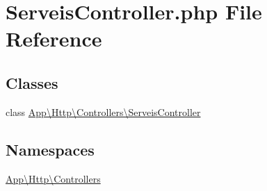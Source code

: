 \hypertarget{_serveis_controller_8php}{}\section{Serveis\+Controller.\+php File Reference}
\label{_serveis_controller_8php}
\subsection*{Classes}
\begin{DoxyCompactItemize}
\item 
class \mbox{\hyperlink{class_app_1_1_http_1_1_controllers_1_1_serveis_controller}{App\textbackslash{}\+Http\textbackslash{}\+Controllers\textbackslash{}\+Serveis\+Controller}}
\end{DoxyCompactItemize}
\subsection*{Namespaces}
\begin{DoxyCompactItemize}
\item 
 \mbox{\hyperlink{namespace_app_1_1_http_1_1_controllers}{App\textbackslash{}\+Http\textbackslash{}\+Controllers}}
\end{DoxyCompactItemize}

